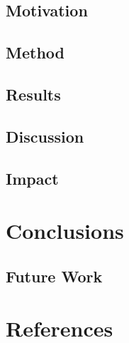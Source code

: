 \documentclass[12pt]{report}
\begin{document}
\section{Motivation}

\section{Method}

\section{Results}

\section{Discussion}



\section{Impact}

\chapter{Conclusions}


\section{Future Work}

\chapter*{References}


\end{document}
